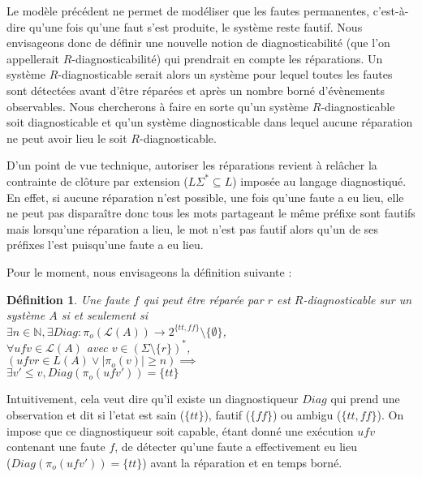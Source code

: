 \documentclass[a4paper,10pt]{article}
\newtheorem{mydef}{D\'efinition}
\begin{document}
Le mod\`ele pr\'ec\'edent ne permet de mod\'eliser que les fautes permanentes, c'est-\`a-dire qu'une fois qu'une faut s'est produite, le syst\`eme reste fautif. Nous envisageons donc de d\'efinir une nouvelle notion de diagnosticabilit\'e (que l'on appellerait $R$-diagnosticabilit\'e) qui prendrait en compte les r\'eparations. Un syst\`eme $R$-diagnosticable serait alors un syst\`eme pour lequel toutes les fautes sont d\'etect\'ees avant d'\^etre r\'epar\'ees et apr\`es un nombre born\'e d'\'ev\`enements observables. Nous chercherons \`a faire en sorte qu'un syst\`eme $R$-diagnosticable soit diagnosticable et qu'un syst\`eme diagnosticable dans lequel aucune r\'eparation ne peut avoir lieu le soit $R$-diagnosticable.

D'un point de vue technique, autoriser les r\'eparations revient \`a rel\^acher la contrainte de cl\^oture par extension ($L\Sigma^*\subseteq L$) impos\'ee au langage diagnostiqu\'e. En effet, si aucune r\'eparation n'est possible, une fois qu'une faute a eu lieu, elle ne peut pas dispara\^itre donc tous les mots partageant le m\^eme pr\'efixe sont fautifs mais lorsqu'une r\'eparation a lieu, le mot n'est pas fautif alors qu'un de ses pr\'efixes l'est puisqu'une faute a eu lieu.

Pour le moment, nous envisageons la d\'efinition suivante :

\begin{mydef}
  Une faute $f$ qui peut \^etre r\'epar\'ee par $r$ est $R$-diagnosticable sur un syst\`eme $A$ si et seulement si\\
  $\exists n \in \mathbb N,\exists Diag : \pi_o(\mathcal L(A)) \to 2^{\{tt, ff\}}\setminus \{\emptyset\}$,\\
  $\forall ufv\in \mathcal L(A)$ avec $v\in \left(\Sigma\setminus \{r\}\right)^*$,\\
  $\left(ufvr \in L(A) \lor |\pi_o(v)| \ge n\right) \implies$\\
  $\exists v'\le v, Diag(\pi_o(ufv'))=\{tt\}$
\end{mydef}

Intuitivement, cela veut dire qu'il existe un diagnostiqueur $Diag$ qui prend une observation et dit si l'etat est sain ($\{tt\}$), fautif ($\{ff\}$) ou ambigu ($\{tt, ff\}$). On impose que ce diagnostiqueur soit capable, \'etant donn\'e une ex\'ecution $ufv$ contenant une faute $f$, de d\'etecter qu'une faute a effectivement eu lieu\\ ($Diag(\pi_o(ufv'))=\{tt\}$) avant la r\'eparation et en temps born\'e.
\end{document}
